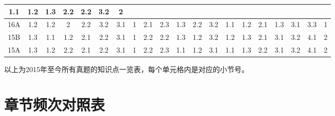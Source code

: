\begin{changemargin}{-2.5cm}{-2.5cm}
\begin{center}
\begin{tabular}{c*{19}{|c}}
                1.1&1.2&1.3&2.2&2.2&3.2&
                2\\\hline
            16A&1.2&1.2&2&2.2&3.2&3.1&
                1&2.1&2.3&
                1.3&2.2&3.2&
                1.1&1.2&2.1&1.3&3.1&3.3&
                1\\\hline
            15B&1.3&1.1&1.2&2.1&2.2&3.1&
                1&2.2&2.2&
                1.3&1.2&3.2&
                1.2&1.3&2.1&3.1&3.2&4.1&
                2\\\hline
            15A&1.3&1.2&2.2&2.1&2.2&3.1&
                1&2.2&2.3&
                1.1&1.2&3.1&
                1.1&1.3&2.2&3.1&3.2&4.1&
                2\\\hline
        \end{tabular}
    \end{center}
\end{changemargin}
以上为2015年至今所有真题的知识点一览表，每个单元格内是对应的小节号。

\section{章节频次对照表}

